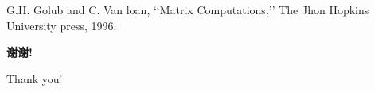 \documentclass[no-math, xcolor=table]{beamer} %
\begin{document}





\begin{thebibliography}{10} %
 G.H. Golub and C. Van loan,
 \newblock ‘‘Matrix Computations,’’
 \newblock The Jhon Hopkins University press, 1996.
\end{thebibliography}

\begin{frame}[c,plain]
\begin{center}
\Huge\color{red}\heiti\bfseries 谢\quad 谢!

  Thank you!
\end{center}
\end{frame}
\end{document}
